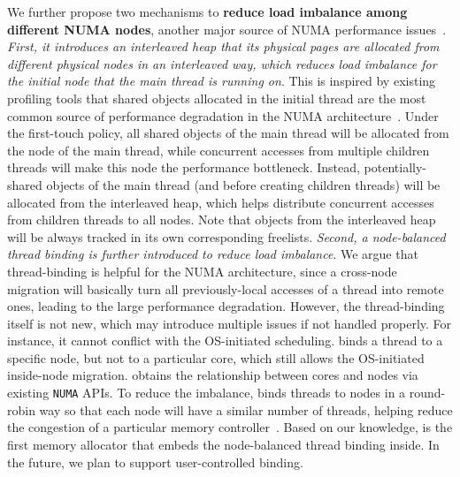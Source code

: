 We further propose two mechanisms to \textbf{reduce load imbalance among different NUMA nodes}, another major source of NUMA performance issues~\cite{Dashti:2013:TMH:2451116.2451157}. \textit{First, it introduces an interleaved heap that its physical pages are allocated from different physical nodes in an interleaved way, which reduces load imbalance for the initial node that the main thread is running on}. This is inspired by existing profiling tools that shared objects allocated in the initial thread are the most common source of performance degradation in the NUMA architecture~\cite{XULIU, MemProf}. Under the first-touch policy, all shared objects of the main thread will be allocated from the node of the main thread, while concurrent accesses from multiple children threads will make this node the performance bottleneck. Instead, potentially-shared objects of the main thread (and before creating children threads) will be allocated from the interleaved heap, which helps distribute concurrent accesses from children threads to all nodes. Note that objects from the interleaved heap will be always tracked in its own corresponding freelists. \textit{Second,  a node-balanced thread binding is further introduced to reduce load imbalance}. We argue that thread-binding is helpful for the NUMA architecture, since a cross-node migration will basically turn all previously-local accesses of a thread into remote ones, leading to the large performance degradation. However, the thread-binding itself is not new, which may introduce multiple issues if not handled properly. For instance, it cannot conflict with the OS-initiated scheduling. \NM{} binds a thread to a specific node, but not to a particular core, which still allows the OS-initiated inside-node migration. \NM{} obtains the relationship between cores and nodes via existing \texttt{NUMA} APIs. 
To reduce the imbalance, \NM{} binds threads to nodes in a round-robin way so that each node will have a similar number of threads, helping reduce the congestion of a particular memory controller~\cite{Blagodurov:2011:CNC:2002181.2002182}. Based on our knowledge, \NM{} is the first memory allocator that embeds the node-balanced thread binding inside. 
In the future, we plan to support user-controlled binding. 

 
